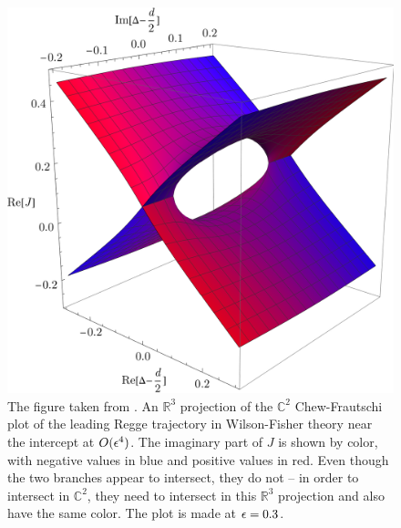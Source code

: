 \begin{figure}[tb]
  \begin{center}
    \includegraphics[scale=.5]{Figures/3dIntercept.pdf}
    \caption{The figure taken from \cite{Caron-Huot:2022eqs}. An $\mathbb{R}^3$ projection of the $\mathbb{C}^2$ Chew-Frautschi plot of the leading Regge trajectory in Wilson-Fisher theory near the intercept at $O(\epsilon^4)$.  The imaginary part of $J$ is shown by color, with negative values in blue and positive values in red. Even though the two branches appear to intersect, they do not -- in order to intersect in $\mathbb{C}^2$, they need to intersect in this $\mathbb{R}^3$ projection and also have the same color.  The plot is made at $\epsilon=0.3$.}
    \label{fig:3dintercept}
  \end{center}
\end{figure}

